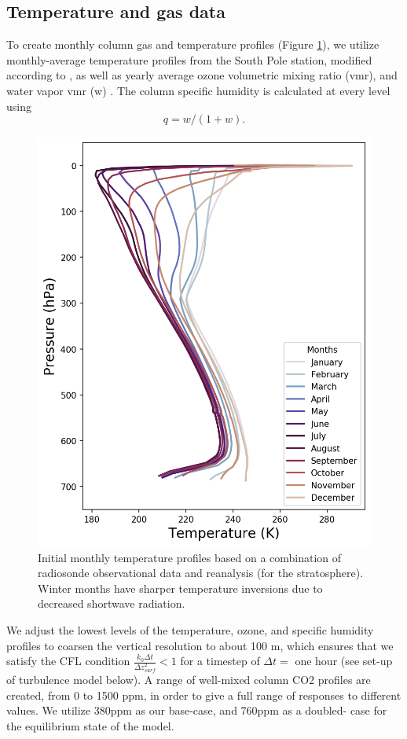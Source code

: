 \documentclass[12]{article}
\begin{document}
\subsection{Temperature and gas data}
 To create monthly column gas and temperature profiles (Figure \ref{fig:temperature_profiles}), we utilize monthly-average temperature profiles from the South Pole station, modified according to \cite{schmithusen_how_2015}, as well as yearly average ozone volumetric mixing ratio (vmr), and water vapor vmr (w) \citep{schmithusen_how_2015}. The column specific humidity is calculated at every level using
\begin{equation}
    q = w/(1+w).
\end{equation}

\begin{figure}[htb!]
\noindent\includegraphics[width=.5\textwidth]{figures/initial_temperature_profiles.png}
\centering
\caption{Initial monthly temperature profiles based on a combination of radiosonde observational data and reanalysis (for the stratosphere). Winter months have sharper temperature inversions due to decreased shortwave radiation.}
\label{fig:temperature_profiles}
\end{figure}

 We adjust the lowest levels of the temperature, ozone, and specific humidity profiles to coarsen the vertical resolution to about 100 m, which ensures that we satisfy the CFL condition $\frac{k_0 \Delta t}{\Delta z^2_{surf}} < 1$ for a timestep of $\Delta t =$ one hour (see set-up of turbulence model below). A range of well-mixed column CO2 profiles are created, from 0 to 1500 ppm, in order to give a full range of responses to different values. We utilize 380ppm as our base-case, and 760ppm as a doubled- case for the equilibrium state of the model.
\end{document}
